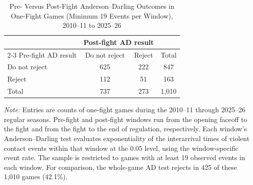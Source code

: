 \begin{table}[htbp]
\centering
\caption{Pre- Versus Post-Fight Anderson--Darling Outcomes in One-Fight Games (Minimum 19 Events per Window), 2010--11 to 2025--26}
\label{tab:one_fight_AD_rejection_min_19_20102011_20252026}
\small
\renewcommand{\arraystretch}{1.15}
\setlength{\tabcolsep}{6pt}

\begin{tabular*}{0.78\textwidth}{@{\extracolsep{\fill}}lccc}
\toprule
 & \multicolumn{2}{c}{Post-fight AD result} & \\
\cmidrule(lr){2-3}
Pre-fight AD result & Do not reject & Reject & Total \\
\midrule
Do not reject & 625 & 222 & 847 \\
Reject & 112 & 51 & 163 \\
\midrule
Total & 737 & 273 & 1,010 \\
\bottomrule
\end{tabular*}

\vspace{0.4em}
\parbox{0.78\textwidth}{
\footnotesize
\textit{Note:} Entries are counts of one-fight games during the 2010--11 through 2025--26 regular seasons. Pre-fight and post-fight windows run from the opening faceoff to the fight and from the fight to the end of regulation, respectively. Each window's Anderson--Darling test evaluates exponentiality of the interarrival times of violent contact events within that window at the 0.05 level, using the window-specific event rate. The sample is restricted to games with at least 19 observed events in each window. For comparison, the whole-game AD test rejects in 425 of these 1,010 games (42.1\%).
}
\end{table}

